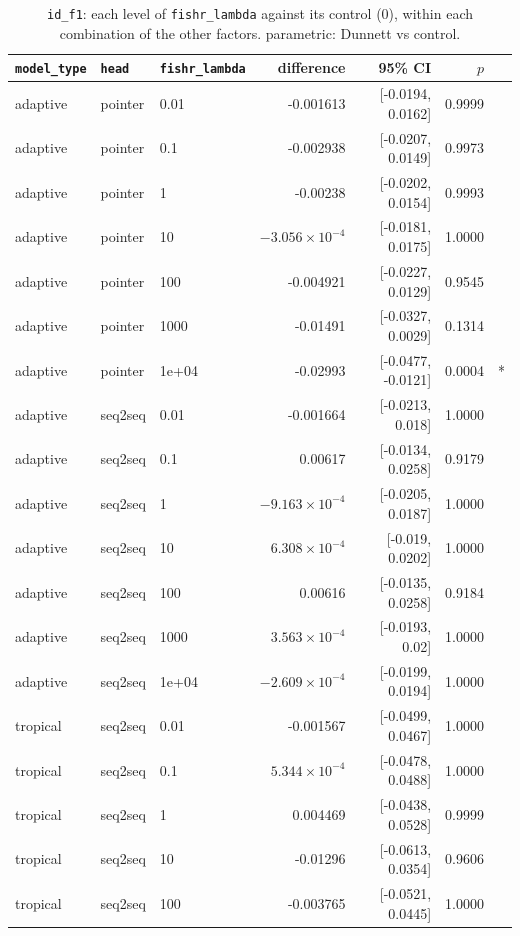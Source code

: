 \documentclass[10pt]{article}
\begin{document}
{\small
\begin{longtable}{lllrrrl}
\caption{\texttt{id\_f1}: each level of \texttt{fishr\_lambda} against its control (0), within each combination of the other factors. parametric: Dunnett vs control.}\label{tab:control-id_f1}\\
\toprule
\texttt{model\_type} & \texttt{head} & \texttt{fishr\_lambda} & difference & 95\% CI & $p$ & \\
\midrule
\endhead
adaptive & pointer & 0.01 & -0.001613 & [-0.0194, 0.0162] & 0.9999 & \\
adaptive & pointer & 0.1 & -0.002938 & [-0.0207, 0.0149] & 0.9973 & \\
adaptive & pointer & 1 & -0.00238 & [-0.0202, 0.0154] & 0.9993 & \\
adaptive & pointer & 10 & $-3.056\times10^{-4}$ & [-0.0181, 0.0175] & 1.0000 & \\
adaptive & pointer & 100 & -0.004921 & [-0.0227, 0.0129] & 0.9545 & \\
adaptive & pointer & 1000 & -0.01491 & [-0.0327, 0.0029] & 0.1314 & \\
adaptive & pointer & 1e+04 & -0.02993 & [-0.0477, -0.0121] & 0.0004 & *\\
adaptive & seq2seq & 0.01 & -0.001664 & [-0.0213, 0.018] & 1.0000 & \\
adaptive & seq2seq & 0.1 & 0.00617 & [-0.0134, 0.0258] & 0.9179 & \\
adaptive & seq2seq & 1 & $-9.163\times10^{-4}$ & [-0.0205, 0.0187] & 1.0000 & \\
adaptive & seq2seq & 10 & $6.308\times10^{-4}$ & [-0.019, 0.0202] & 1.0000 & \\
adaptive & seq2seq & 100 & 0.00616 & [-0.0135, 0.0258] & 0.9184 & \\
adaptive & seq2seq & 1000 & $3.563\times10^{-4}$ & [-0.0193, 0.02] & 1.0000 & \\
adaptive & seq2seq & 1e+04 & $-2.609\times10^{-4}$ & [-0.0199, 0.0194] & 1.0000 & \\
tropical & seq2seq & 0.01 & -0.001567 & [-0.0499, 0.0467] & 1.0000 & \\
tropical & seq2seq & 0.1 & $5.344\times10^{-4}$ & [-0.0478, 0.0488] & 1.0000 & \\
tropical & seq2seq & 1 & 0.004469 & [-0.0438, 0.0528] & 0.9999 & \\
tropical & seq2seq & 10 & -0.01296 & [-0.0613, 0.0354] & 0.9606 & \\
tropical & seq2seq & 100 & -0.003765 & [-0.0521, 0.0445] & 1.0000 & \\

\end{longtable}}
\end{document}
